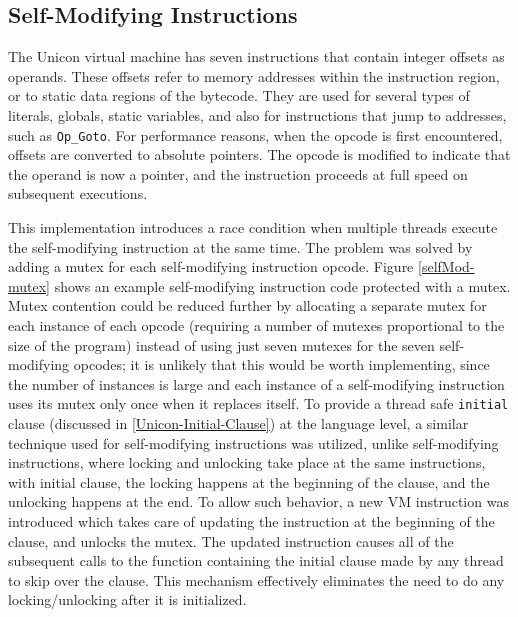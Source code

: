 \subsection{Self-Modifying Instructions}
The Unicon virtual machine has seven instructions that contain integer
offsets as operands.  These offsets refer to memory addresses within the
instruction region, or to static data regions of the bytecode. They are
used for several types of literals, globals, static variables, and also for
instructions that jump to addresses, such as \texttt{Op\_Goto}. For
performance reasons, when the opcode is first encountered, offsets are
converted to absolute pointers.  The opcode is modified to indicate that
the operand is now a pointer, and the instruction proceeds at full speed on
subsequent executions.

This implementation introduces a race condition when multiple threads
execute the self-modifying instruction at the same time. The problem was
solved by adding a mutex for each self-modifying instruction
opcode. Figure \ref{selfMod-mutex} shows an example self-modifying
instruction code protected with a mutex. Mutex contention could be reduced
further by allocating a separate mutex for each instance of each opcode
(requiring a number of mutexes proportional to the size of the program)
instead of using just seven mutexes for the seven self-modifying opcodes;
it is unlikely that this would be worth implementing, since the number of
instances is large and each instance of a self-modifying instruction uses
its mutex only once when it replaces itself.  To provide a thread safe
\texttt{initial} clause (discussed in \ref{Unicon-Initial-Clause}) at the language
level, a similar technique used for self-modifying instructions was
utilized, unlike self-modifying instructions, where locking and unlocking
take place at the same instructions, with initial clause, the locking
happens at the beginning of the clause, and the unlocking happens at the
end. To allow such behavior, a new VM instruction was introduced which
takes care of updating the instruction at the beginning of the clause, and
unlocks the mutex. The updated instruction causes all of the subsequent
calls to the function containing the initial clause made by any thread to
skip over the clause.  This mechanism effectively eliminates the need to do
any locking/unlocking after it is initialized.

